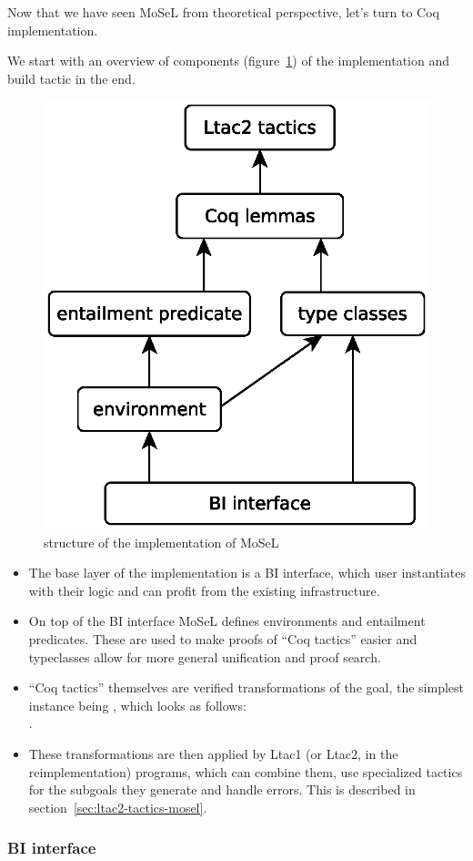 Now that we have seen MoSeL from theoretical perspective, let's turn to Coq implementation.

We start with an overview of components (figure~\ref{fig:ipm-diagram}) of the implementation and build  tactic in the end.

\begin{figure}
  \includegraphics[width=0.5\linewidth]{ipm-diagram}
  \caption{structure of the implementation of MoSeL}
  \label{fig:ipm-diagram}
\end{figure}


\begin{itemize}
\item The base layer of the implementation is a BI interface, which user instantiates with their logic and can profit from the existing infrastructure.
\item On top of the BI interface MoSeL defines environments and entailment predicates. These are used to make proofs of ``Coq tactics'' easier and typeclasses allow for more general unification and proof search.
\item ``Coq tactics'' themselves are verified transformations of the goal, the simplest instance being , which looks as follows:\\
.
\item These transformations are then applied by Ltac1 (or Ltac2, in the reimplementation) programs, which can combine them, use specialized tactics for the subgoals they generate and handle errors.
  This is described in section~\ref{sec:ltac2-tactics-mosel}.
\end{itemize}

\subsubsection{BI interface}
\label{subsubsec:bi-interface}

